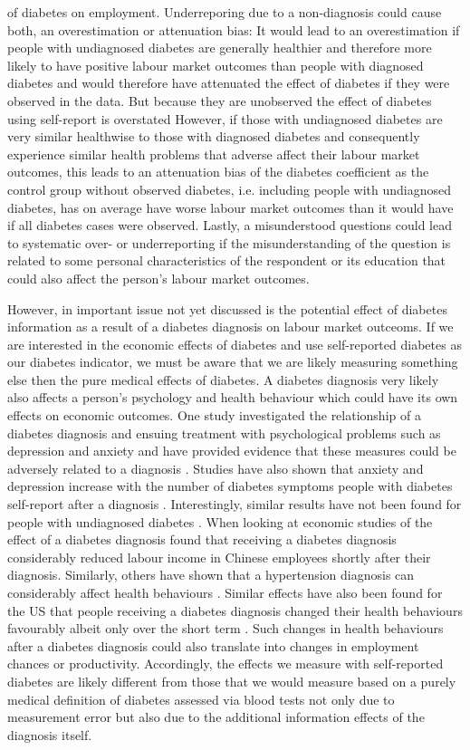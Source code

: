 of diabetes on employment. Underreporing due to a non-diagnosis could cause both, an overestimation or attenuation bias: It would lead to an overestimation if people with undiagnosed diabetes are generally healthier and therefore more likely to have positive labour market outcomes than people with diagnosed diabetes and would therefore have attenuated the effect of diabetes if they were observed in the data. But because they are unobserved the effect of diabetes using self-report is overstated However, if those with undiagnosed diabetes are very similar healthwise to those with diagnosed diabetes and consequently experience similar health problems that adverse affect their labour market outcomes, this leads to an attenuation bias of the diabetes coefficient as the control group without observed diabetes, i.e. including people with undiagnosed diabetes, has on average have worse labour market outcomes than it would have if all diabetes cases were observed. Lastly, a misunderstood questions could lead to systematic over- or underreporting if the misunderstanding of the question is related to some personal characteristics of the respondent or its education that could also affect the person's labour market outcomes.

However, in important issue not yet discussed is the potential effect of diabetes information as a result of a diabetes diagnosis on labour market outceoms. If we are interested in the economic effects of diabetes and use self-reported diabetes as our diabetes indicator, we must
be aware that we are likely measuring something else then the pure
medical effects of diabetes. A diabetes diagnosis very likely also affects
a person's psychology and health behaviour which could have its own
effects on economic outcomes. One study investigated the relationship of a diabetes diagnosis and ensuing treatment with psychological problems such as depression and anxiety and have provided evidence that these measures could be adversely related to a diagnosis \citep{17003303}. Studies have also shown that anxiety and depression increase with the number of diabetes symptoms people with diabetes self-report after a diagnosis \cite{Paddison_2011}. Interestingly, similar results have not been found for people with undiagnosed diabetes \cite{Nouwen_2011}. When looking at economic studies of the effect of a diabetes diagnosis \citet{Liu2014} found that receiving a diabetes diagnosis
considerably reduced labour income in Chinese employees shortly after
their diagnosis. Similarly, others have shown that a hypertension
diagnosis can considerably affect health behaviours \citep{Zhao2013a}.
Similar effects have also been found for the US that people receiving
a diabetes diagnosis changed their health behaviours favourably albeit
only over the short term \citep{Slade2012}. Such changes in health
behaviours after a diabetes diagnosis could also translate into changes
in employment chances or productivity. Accordingly, the effects we measure with self-reported diabetes are
likely different from those that we would measure based on a purely
medical definition of diabetes assessed via blood tests not only due to measurement error but also due to the additional information effects of the diagnosis itself.


  
  
  
  
  
  
  
  